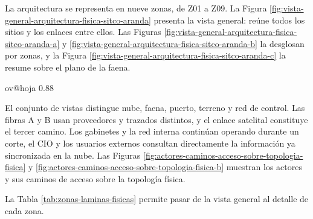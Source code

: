 \documentclass[subdoc]{../../comun/overfore}
\begin{document}
La arquitectura se representa en nueve zonas, de Z01 a Z09. La Figura \ref{fig:vista-general-arquitectura-fisica-sitco-aranda} presenta la vista general: reúne todos los sitios y los enlaces entre ellos. Las Figuras \ref{fig:vista-general-arquitectura-fisica-sitco-aranda-a} y \ref{fig:vista-general-arquitectura-fisica-sitco-aranda-b} la desglosan por zonas, y la Figura \ref{fig:vista-general-arquitectura-fisica-sitco-aranda-c} la resume sobre el plano de la faena.

\begin{horizontal}
\csname ov@hoja\endcsname{330.2mm}{215.9mm}
\expandafter\def\csname ov@altofig\endcsname{0.88}

\clearpage
\addtocounter{figure}{-1}
\begingroup
\def\thefigure{4.23a}
\def\theHfigure{4.23a}
\endgroup


\clearpage
\addtocounter{figure}{-1}
\begingroup
\def\thefigure{4.23b}
\def\theHfigure{4.23b}
\endgroup


\clearpage
\addtocounter{figure}{-1}
\begingroup
\def\thefigure{4.23c}
\def\theHfigure{4.23c}
\endgroup
\end{horizontal}
El conjunto de vistas distingue nube, faena, puerto, terreno y red de control. Las fibras A y B usan proveedores y trazados distintos, y el enlace satelital constituye el tercer camino. Los gabinetes y la red interna continúan operando durante un corte, el CIO y los usuarios externos consultan directamente la información ya sincronizada en la nube. Las Figuras \ref{fig:actores-caminos-acceso-sobre-topologia-fisica} y \ref{fig:actores-caminos-acceso-sobre-topologia-fisica-b} muestran los actores y sus caminos de acceso sobre la topología física.

La Tabla \ref{tab:zonas-laminas-fisicas} permite pasar de la vista general al detalle de cada zona.
\end{document}
